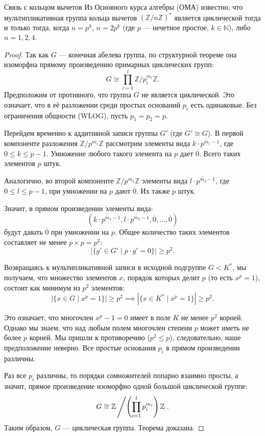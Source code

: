 \begin{Remark}{Связь с кольцом вычетов}{}
	Из Основного курса алгебры (ОМА) известно, что мультипликативная группа кольца вычетов $(\mathbb{Z}/n\mathbb{Z})^*$ является циклической тогда и только тогда, когда $n = p^k$, $n = 2p^k$ (где $p$ --- нечетное простое, $k \in \mathbb{N}$), либо $n = 1, 2, 4$.
\end{Remark}

\begin{proof}
	Так как $G$ --- конечная абелева группа, по структурной теореме она изоморфна прямому произведению примарных циклических групп:
	\[
	G \cong \prod_{i=1}^l \mathbb{Z}/p_i^{m_i}\mathbb{Z}.
	\]
	Предположим от противного, что группа $G$ не является циклической. Это означает, что в её разложении среди простых оснований $p_i$ есть одинаковые. Без ограничения общности (WLOG), пусть $p_1 = p_2 = p$.
	
	Перейдем временно к аддитивной записи группы $G'$ (где $G' \cong G$).
	В первой компоненте разложения $\mathbb{Z}/p^{m_1}\mathbb{Z}$ рассмотрим элементы вида $\overline{k \cdot p^{m_1-1}}$, где $0 \le k \le p-1$. Умножение любого такого элемента на $p$ дает $\overline{0}$. Всего таких элементов $p$ штук.
	
	Аналогично, во второй компоненте $\mathbb{Z}/p^{m_2}\mathbb{Z}$ элементы вида $\overline{l \cdot p^{m_2-1}}$, где $0 \le l \le p-1$, при умножении на $p$ дают $\overline{0}$. Их также $p$ штук.
	
	Значит, в прямом произведении элементы вида:
	\[
	(\overline{k \cdot p^{m_1-1}}, \overline{l \cdot p^{m_2-1}}, \overline{0}, \dots, \overline{0})
	\]
	будут давать $\overline{0}$ при умножении на $p$. Общее количество таких элементов составляет не менее $p \times p = p^2$:
	\[
	\left| \{ g' \in G' \mid p \cdot g' = 0 \} \right| \ge p^2.
	\]
	
	Возвращаясь к мультипликативной записи в исходной подгруппе $G < K^*$, мы получаем, что множество элементов $x$, порядок которых делит $p$ (то есть $x^p = 1$), состоит как минимум из $p^2$ элементов:
	\[
	\left| \{ x \in G \mid x^p = 1 \} \right| \ge p^2 \implies \left| \{ x \in K^* \mid x^p = 1 \} \right| \ge p^2.
	\]
	
	Это означает, что многочлен $x^p - 1 = 0$ имеет в поле $K$ не менее $p^2$ корней. Однако мы знаем, что над любым полем многочлен степени $p$ может иметь не более $p$ корней.
	Мы пришли к противоречию ($p^2 \le p$), следовательно, наше предположение неверно. Все простые основания $p_i$ в прямом произведении различны.
	
	Раз все $p_i$ различны, то порядки сомножителей попарно взаимно просты, а значит, прямое произведение изоморфно одной большой циклической группе:
	\[
	G \cong \mathbb{Z} \left/ \left( \prod_{i=1}^l p_i^{m_i} \right) \mathbb{Z} \right..
	\]
	Таким образом, $G$ --- циклическая группа. Теорема доказана.
\end{proof}